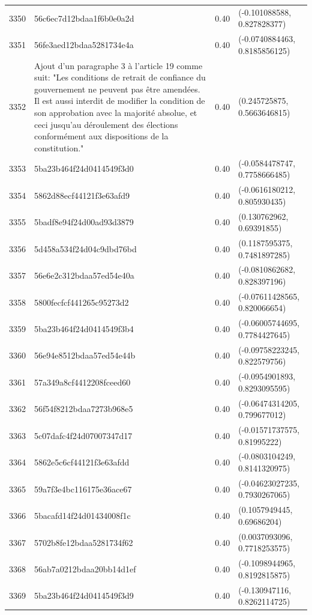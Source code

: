 \begin{table}[ht]
\begin{tabular}{rlrl}
  3350 & 56c6ec7d12bdaa1f6b0e0a2d & 0.40 & (-0.101088588, 0.827828377) \\ 
  3351 & 56fe3aed12bdaa5281734e4a & 0.40 & (-0.0740884463, 0.8185856125) \\ 
  3352 & Ajout d'un paragraphe 3 à l'article 19 comme suit: "Les conditions de retrait de confiance du gouvernement ne peuvent pas être amendées. Il est aussi interdit de modifier la condition de son approbation avec la majorité absolue, et ceci jusqu'au déroulement des élections conformément aux dispositions de la constitution." & 0.40 & (0.245725875, 0.5663646815) \\ 
  3353 & 5ba23b464f24d0414549f3d0 & 0.40 & (-0.0584478747, 0.7758666485) \\ 
  3354 & 5862d88ecf44121f3e63afd9 & 0.40 & (-0.0616180212, 0.805930435) \\ 
  3355 & 5badf8e94f24d00ad93d3879 & 0.40 & (0.130762962, 0.69391855) \\ 
  3356 & 5d458a534f24d04c9dbd76bd & 0.40 & (0.1187595375, 0.7481897285) \\ 
  3357 & 56e6e2c312bdaa57ed54e40a & 0.40 & (-0.0810862682, 0.828397196) \\ 
  3358 & 5800fecfcf441265c95273d2 & 0.40 & (-0.07611428565, 0.820066654) \\ 
  3359 & 5ba23b464f24d0414549f3b4 & 0.40 & (-0.06005744695, 0.7784427645) \\ 
  3360 & 56e94e8512bdaa57ed54e44b & 0.40 & (-0.09758223245, 0.822579756) \\ 
  3361 & 57a349a8cf4412208fceed60 & 0.40 & (-0.0954901893, 0.8293095595) \\ 
  3362 & 56f54f8212bdaa7273b968e5 & 0.40 & (-0.06474314205, 0.799677012) \\ 
  3363 & 5c07dafc4f24d07007347d17 & 0.40 & (-0.01571737575, 0.81995222) \\ 
  3364 & 5862e5c6cf44121f3e63afdd & 0.40 & (-0.0803104249, 0.8141320975) \\ 
  3365 & 59a7f3e4bc116175e36ace67 & 0.40 & (-0.04623027235, 0.7930267065) \\ 
  3366 & 5bacafd14f24d01434008f1c & 0.40 & (0.1057949445, 0.69686204) \\ 
  3367 & 5702b8fe12bdaa5281734f62 & 0.40 & (0.0037093096, 0.7718253575) \\ 
  3368 & 56ab7a0212bdaa20bb14d1ef & 0.40 & (-0.1098944965, 0.8192815875) \\ 
  3369 & 5ba23b464f24d0414549f3d9 & 0.40 & (-0.130947116, 0.8262114725) \\ 

\end{tabular}
\end{table}
